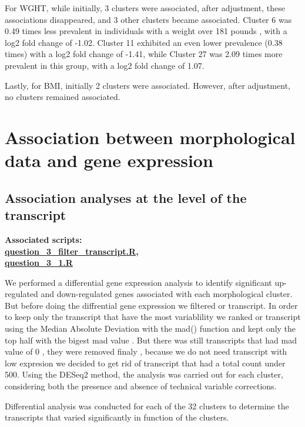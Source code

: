 \documentclass[a4paper, 11pt]{article}
\begin{document}
\begin{multicols}{2}
For WGHT, while initially, 3 clusters were associated, after adjustment, these associations disappeared, and 3 other clusters became associated. Cluster 6 was 0.49 times less prevalent in individuals with a weight over 181 pounds , with a log2 fold change of -1.02. Cluster 11 exhibited an even lower prevalence (0.38 times) with a log2 fold change of -1.41, while Cluster 27 was 2.09 times more prevalent in this group, with a log2 fold change of 1.07.

Lastly, for BMI, initially 2 clusters were associated. However, after adjustment, no clusters remained associated. 



\section{Association between morphological data and gene expression}
\subsection{Association analyses at the level of the transcript}
\begin{scriptsize}	
	\textbf{Associated scripts:\\ 
	\href{https://github.com/leopoldguyot/BINF-F401-Project/blob/main/question_3_filter_transcript.R}{question\_3\_filter\_transcript.R},\\
	\href{https://github.com/leopoldguyot/BINF-F401-Project/blob/main/question_3_1.R}{question\_3\_1.R}
	}
\end{scriptsize}

We performed a differential gene expression analysis to identify significant up-regulated and down-regulated genes associated with each morphological cluster.
But before doing the diffrential gene expression we filtered or transcript. In order to keep only the transcript that have the most variablility we ranked or transcript using the Median Absolute Deviation with the mad() function and kept only the top half with the bigest mad value . But there was still transcripts that had  mad value of 0 , they were removed finaly , because we do not need transcript with low expresion we decided to get rid of transcript that had a total count under 500. 
 Using the DESeq2 method, the analysis was carried out for each cluster, considering both the presence and absence of technical variable corrections. 

Differential analysis was conducted for each of the 32 clusters to determine the transcripts that varied significantly in function of the clusters.


\end{multicols}
\end{document}
